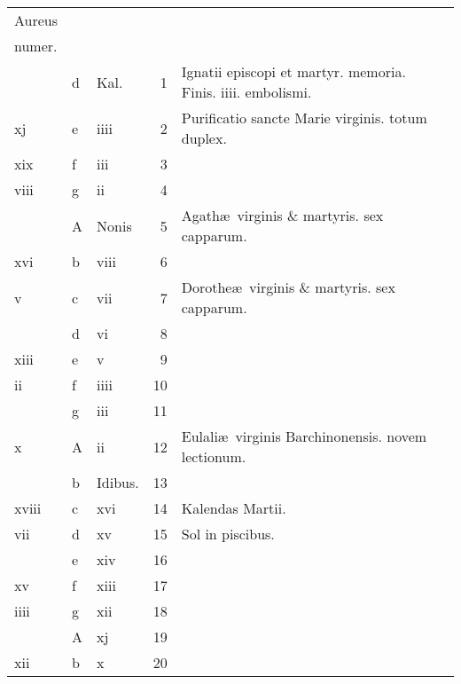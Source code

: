 \documentclass[11pt,openany]{book}
\begin{document}
\begin{center}
\begin{tabular}{l | l | l | r | l r}
\color{Red}Aureus & & & & \color{Red} \\
\color{Red}numer. & & & & \color{Red} \\
 & d & \color{Red} Kal. & 1 & \color{Red} Ignatii episcopi et martyr. memoria. \quad Finis. iiii. embolismi. \\
\color{Red} xj & e & \color{Red} iiii & 2 & Purificatio sancte Marie virginis. totum duplex. \\
\color{Red} xix & f & \color{Red} iii & 3 & & \color{Red} \\
\color{Red} viii & g & \color{Red} ii & 4 & & \color{Red} \\
 & \color{Red} A & Nonis & 5 & Agath\ae \ virginis \& martyris. \color{Red} sex capparum. & \color{Red} \\
\color{Red} xvi & b & \color{Red} viii & 6 & & \color{Red} \\
\color{Red} v & c & \color{Red} vii & 7 & Dorothe\ae \ virginis \& martyris. \color{Red} sex capparum. & \color{Red} \\
\color{Red}  & d & \color{Red} vi & 8 & & \color{Red} \\
\color{Red} xiii & e & \color{Red} v & 9 & & \color{Red} \\
\color{Red} ii & f & \color{Red} iiii & 10 & & \color{Red} \\
\color{Red}  & g & \color{Red} iii & 11 & & \color{Red} \\
\color{Red} x & \color{Red} A & \color{Red} ii & 12 & Eulali\ae \ virginis Barchinonensis. \color{Red} novem lectionum. & \color{Red} \\
\color{Red}  & b & Idibus. & 13 & & \color{Red} \\
\color{Red} xviii & c & \color{Red} xvi & 14 & \quad \color{Red} Kalendas Martii. & \color{Red} \\
\color{Red} vii & d & \color{Red} xv & 15 & \qquad \color{Red} Sol in piscibus. & \color{Red} \\
\color{Red}  & e & \color{Red} xiv & 16 & & \color{Red} \\
\color{Red} xv & f & \color{Red} xiii & 17 & & \color{Red} \\
\color{Red} iiii & g & \color{Red} xii & 18 & & \color{Red} \\
\color{Red}  & \color{Red} A & \color{Red} xj & 19 & & \color{Red} \\
\color{Red} xii & b & \color{Red} x & 20 & & \color{Red} \\

\end{tabular}
\end{center}
\end{document}
